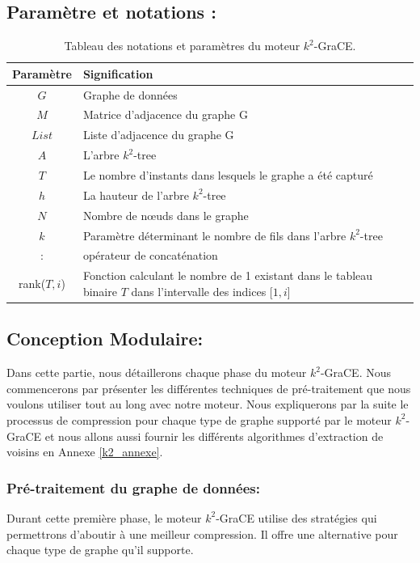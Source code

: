 \documentclass[a4paper,oneside,12pt]{report}
\theoremstyle{definition}
\begin{document}
		\subsection{Paramètre et notations :}
				
		\begin{table}[H]
		\centering
		\begin{tabular}{|c|L{12cm}|}
		\hline Paramètre & Signification \\ \hline\hline 
		$G$ & Graphe de données \\ \hline
		$M$ & Matrice d'adjacence du graphe G\\ \hline
		$List$ & Liste d'adjacence du graphe G\\ \hline
		$A$ & L'arbre $k^2$-tree \\\hline
		$T$ & Le nombre d'instants dans lesquels le graphe a été capturé \\\hline
		$h$ & La hauteur de l'arbre $k^2$-tree \\ \hline
		$N$ & Nombre de nœuds dans le graphe \\ \hline
		$k$ & Paramètre déterminant le nombre de fils dans l'arbre $k^2$-tree\\ \hline
		: & opérateur de concaténation \\ \hline
		rank($T,i$) &  Fonction calculant le nombre de 1 existant dans le tableau binaire $T$ dans l'intervalle des indices [$1,i$] \\ \hline
		\end{tabular}
		\caption{Tableau des notations et paramètres du moteur $k^2$-GraCE.}	
		\label{notk2grace}		
	\end{table}
	
		\subsection{Conception Modulaire:}
		
		Dans cette partie, nous détaillerons chaque phase du moteur $k^2$-GraCE. Nous commencerons par présenter les différentes techniques de pré-traitement 
		que nous voulons utiliser tout au long avec notre moteur. Nous expliquerons par la suite le processus de compression pour chaque type de graphe supporté par le moteur $k^2$-GraCE et nous allons aussi fournir les différents algorithmes d'extraction de voisins en Annexe \ref{k2_annexe}. 
		
			\subsubsection{Pré-traitement du graphe de données:}
Durant cette première phase, le moteur $k^2$-GraCE utilise des stratégies qui permettrons d'aboutir à une meilleur compression. Il offre une alternative pour chaque type de graphe qu'il supporte. 		
			
\end{document}
